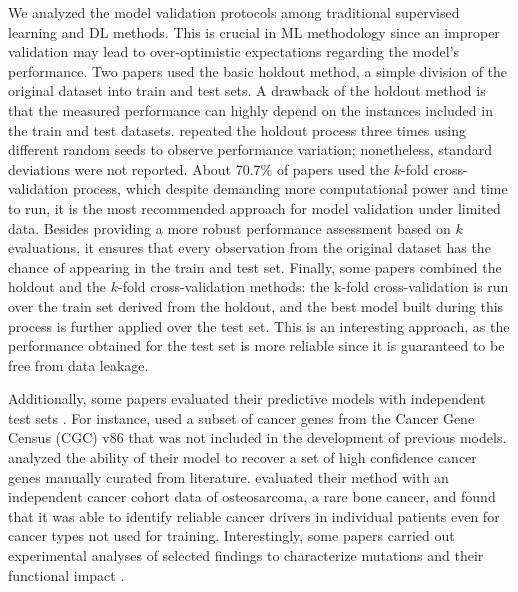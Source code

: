 We analyzed the model validation protocols among traditional supervised learning and DL methods. This is crucial in ML methodology since an improper validation may lead to over-optimistic expectations regarding the model's performance. Two papers \cite{Tavanaei2017, Celli2018} used the basic holdout method, \ie a simple division of the original dataset into train and test sets.
A drawback of the holdout method is that the measured performance can highly depend on the instances included in the train and test datasets. \citet{Tavanaei2017} repeated the holdout process three times using different random seeds to observe performance variation; nonetheless, standard deviations were not reported. About 70.7\% of papers used the $k$-fold cross-validation process, which despite demanding more computational power and time to run, it is the most recommended approach for model validation under limited data. Besides providing a more robust performance assessment based on $k$ evaluations, it ensures that every observation from the original dataset has the chance of appearing in the train and test set. Finally, some papers \cite{Manolakos2014, Agajanian2018, Agajanian2019, Luo2019, Nicora2019} combined the holdout and the $k$-fold cross-validation methods: the k-fold cross-validation is run over the train set derived from the holdout, and the best model built during this process is further applied over the test set. This is an interesting approach, as the performance obtained for the test set is more reliable since it is guaranteed to be free from data leakage.

Additionally, some papers evaluated their predictive models with independent test sets \cite{Tan2012, Mao2013, Schroeder2014, Anoosha2015, Soliman2015, Dong2016, Tavanaei2017, Zhou2018, Collier2019, Han2019, Luo2019, Colaprico2020, Lyu2020, Wang2020, Nulsen2021}. For instance, \citet{Collier2019} used a subset of cancer genes from the Cancer Gene Census (CGC) v86 that was not included in the development of previous models. \citet{Han2019} analyzed the ability of their model to recover a set of high confidence cancer genes manually curated from literature.
\citet{Nulsen2021} evaluated their method with an independent cancer cohort data of osteosarcoma, a rare bone cancer, and found that it was able to identify reliable cancer drivers in individual patients even for cancer types not used for training. Interestingly, some papers carried out experimental analyses of selected findings to characterize mutations and their functional impact \cite{U2014, Wang2018, Han2019}.

